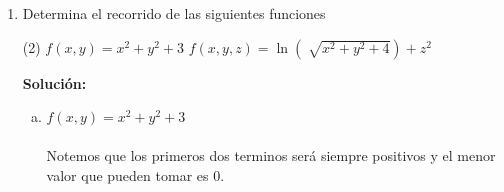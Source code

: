 \documentclass[12pt]{article}
\newenvironment{solucion}
{\begin{mdframed}[backgroundcolor=black!10]
		{\bf Solución:}\\
	}
	{
	\end{mdframed}
}
\newenvironment{preguntas}
{\begin{enumerate}\itemsep12pt
	}
	{
	\end{enumerate}
}
\newcommand{\ra}{\rightarrow}
\newcommand{\R}{\mathbb{R}}
\begin{document}
\begin{preguntas}
\begin{solucion}
\begin{enumerate}[a)]
\item $f(x, y) = \sqrt[]{x+y} + \ln(x^2+y^2)$\\
\\
Notemos que hay dos restricciones que se deben cumplir. La raiz no debe tener argumento negativo y el logaritmo debe tener argumento positivo. Luego, el dominio de la función es
$$Dom(f) = \{(x,y) \in \R^2 | x + y \geq 0 \wedge x^2 + y^2 > 0\}$$
\item $f(x,y) = \dfrac{x+y}{x^2-y^2}$\\
\\
En este caso nuestra unica restricción es que el denominador sea distinto de 0, por lo que debe ocurrir que
$$x^2 - y^2 \neq 0 \ra x \neq y \wedge x \neq -y$$
Por lo que el dominio será
$$Dom(f) = \{(x,y) \in \R^2 | x \neq y \wedge x \neq -y\}$$
\item $f(x,y,z) = ln(z+y) - \dfrac{1}{x^2 +z^2}$\\
\\
Nuevamente debemos hacer que el logaritmo sea positivo y el denominador distinto de 0. Para el logaritmo es trivial pero notemos que el denominador solo podrá ser 0 si $x$ y $z$ son 0. \\

Luego,
$$Dom(f) = \{(x,y,z) \in \R^3 | z + y > 0 \wedge (x,y,z) \neq (0,y,0) \forall y \in \R \}$$
\item $f(x,y,z) = \sqrt[]{\ln(x+y+z)}$\\
\\
En este caso, notemos que no solamente el argumento del logaritmo debe ser positivo, sino que tambien el resultado de este debe ser no negativo, ya que esto irá dentro de la raiz.\\

Esto es,
$$\ln(x+y+z) \geq 0 \ra x + y + z \geq 1$$
Finalmente,
$$Dom(f) = \{(x,y,z) \in \R^3 | x + y + z \geq 1 \}$$
\end{enumerate}
\end{solucion}
\item Determina el recorrido de las siguientes funciones
\begin{tasks}(2)
\task $f(x,y) = x^2 + y^2 + 3$
\task $f(x,y,z) = \ln(\sqrt[]{x^2+y^2+4}) + z^2$
\end{tasks}
\begin{solucion}

\begin{enumerate}[a)]
\item $f(x,y) = x^2 + y^2 + 3$\\
\\
Notemos que los primeros dos terminos será siempre positivos y el menor valor que pueden tomar es 0.\\


\end{enumerate}
\end{solucion}
\end{preguntas}
\end{document}
